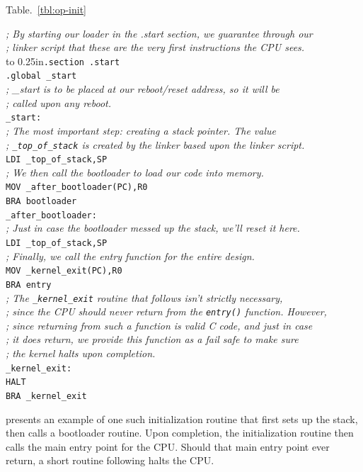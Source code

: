 \documentclass{gqtekspec}
\begin{document}
Table.~\ref{tbl:op-init}
\begin{table}\begin{center}
\begin{tabbing}
{\em ; By starting our loader in the .start section, we guarantee through our}\\
{\em ; linker script that these are the very first instructions the CPU sees.}\\
\hbox to 0.25in{}\={\tt .section .start} \\
\>	{\tt .global \_start} \\
{\em ; \_start is to be placed at our reboot/reset address, so it will be}\\
{\em ; called upon any reboot.}\\
{\tt \_start:} \\
\> {\em ; The most important step: creating a stack pointer.  The value}\\
\> {\em ; {\tt \_top\_of\_stack} is created by the linker based upon the linker script.}\\
\>	{\tt LDI \_top\_of\_stack,SP} \\
\> {\em ; We then call the bootloader to load our code into memory.}\\
\>	{\tt MOV \_after\_bootloader(PC),R0} \\
\>	{\tt BRA bootloader} \\
{\tt \_after\_bootloader:} \\
\>	{\em ; Just in case the bootloader messed up the stack, we'll reset it here.}\\
\>	{\tt LDI \_top\_of\_stack,SP} \\
\>	{\em ; Finally, we call the entry function for the entire design.}\\
\>	{\tt MOV \_kernel\_exit(PC),R0}\\
\>	{\tt BRA entry}\\
{\em ; The {\tt \_kernel\_exit} routine that follows isn't strictly necessary,}\\
{\em ; since the CPU should never return from the {\tt entry()} function.  However,}\\
{\em ; since returning from such a function is valid C code, and just in case}\\
{\em ; it does return, we provide this function as a fail safe to make sure}\\
{\em ; the kernel halts upon completion.}\\
{\tt \_kernel\_exit:}\\
\> {\tt HALT}\\
\> {\tt BRA \_kernel\_exit}
\end{tabbing}
\caption{Setting up a stack frame and starting the CPU}\label{tbl:op-init}
\end{center}\end{table}
presents an example of one such initialization routine
that first sets up the stack, then calls a bootloader routine.  Upon completion,
the initialization routine then calls the main entry point for the CPU.  Should
that main entry point ever return, a short routine following halts the CPU.
\end{document}
